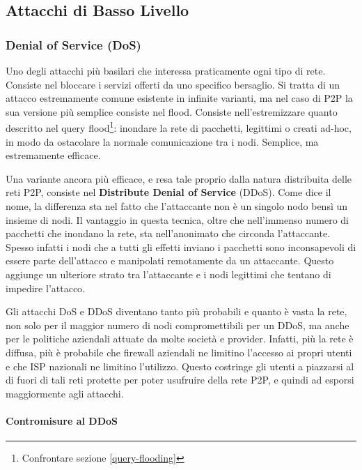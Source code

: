 \subsection{Attacchi di Basso Livello}\label{attacchi-di-basso-livello}

\subsubsection{Denial of Service (DoS)}\label{denial-of-service-dos}

Uno degli attacchi più basilari che interessa praticamente ogni tipo di rete. Consiste nel bloccare i servizi offerti da uno specifico bersaglio. Si tratta di un attacco estremamente comune esistente in infinite varianti, ma nel caso di P2P la sua versione più semplice consiste nel flood. Consiste nell'estremizzare quanto descritto nel query flood\footnote{Confrontare sezione \ref{query-flooding}}: inondare la rete di pacchetti, legittimi o creati ad-hoc, in modo da ostacolare la normale comunicazione tra i nodi. Semplice, ma estremamente efficace.

Una variante ancora più efficace, e resa tale proprio dalla natura distribuita delle reti P2P, consiste nel \textbf{Distribute Denial of Service} (DDoS). Come dice il nome, la differenza sta nel fatto che l'attaccante non è un singolo nodo bensì un insieme di nodi. Il vantaggio in questa tecnica, oltre che nell'immenso numero di pacchetti che inondano la rete, sta nell'anonimato che circonda l'attaccante. Spesso infatti i nodi che a tutti gli effetti inviano i pacchetti sono inconsapevoli di essere parte dell'attacco e manipolati remotamente da un attaccante. Questo aggiunge un ulteriore strato tra l'attaccante e i nodi legittimi che tentano di impedire l'attacco.

Gli attacchi DoS e DDoS diventano tanto più probabili e quanto è vasta la rete, non solo per il maggior numero di nodi compromettibili per un DDoS, ma anche per le politiche aziendali attuate da molte società e provider. Infatti, più la rete è diffusa, più è probabile che firewall aziendali ne limitino l'accesso ai propri utenti e che ISP nazionali ne limitino l'utilizzo. Questo costringe gli utenti a piazzarsi al di fuori di tali reti protette per poter usufruire della rete P2P, e quindi ad esporsi maggiormente agli attacchi.

\paragraph{Contromisure al DDoS}\label{contromisure-al-ddos}

